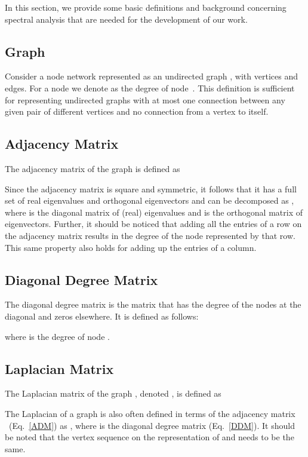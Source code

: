 \documentclass[conference,fleqn]{IEEEtran}
\begin{document}
In this section, we provide some basic definitions and  background concerning spectral analysis 
that are needed for the development of our work.

\subsection{Graph}
\label{subsec:Grp}
Consider a  node network represented as an undirected graph ,
with  vertices and  edges. For a node  we denote as  the degree
of node~. This definition is sufficient for representing undirected graphs with at most 
one connection between any given pair of different vertices and no connection from a vertex 
to itself. 


\subsection{Adjacency Matrix}
\label{subsec:AdjMatrix}
The adjacency matrix  of the graph  is defined as


Since the adjacency matrix is square and symmetric, it follows that it has a full set of real 
eigenvalues and orthogonal eigenvectors and can be decomposed as \mbox{}, 
where  is the diagonal matrix of (real) eigenvalues and  is the orthogonal matrix of eigenvectors. 
Further, it should be noticed that adding all the entries of a row on the adjacency matrix results 
in the degree of the node represented by that row. This same property also holds for adding up the entries of a column.

\subsection{Diagonal Degree Matrix}
\label{subsec:DDgMatrix}
The diagonal degree matrix  is the matrix that has the degree of the nodes at the diagonal and zeros elsewhere. It is 
defined as follows:

where  is the degree of node .


\subsection{Laplacian Matrix}
\label{subsec:Lap}
The Laplacian matrix of the graph , denoted , is
defined as



The Laplacian of a graph is also often defined in terms of the adjacency matrix 
~(Eq.~\eqref{ADM}) as ,
where  is the diagonal degree matrix (Eq.~\eqref{DDM}). It should be noted 
that the vertex sequence on the representation of  and  needs 
to be the same.
 
\end{document}
